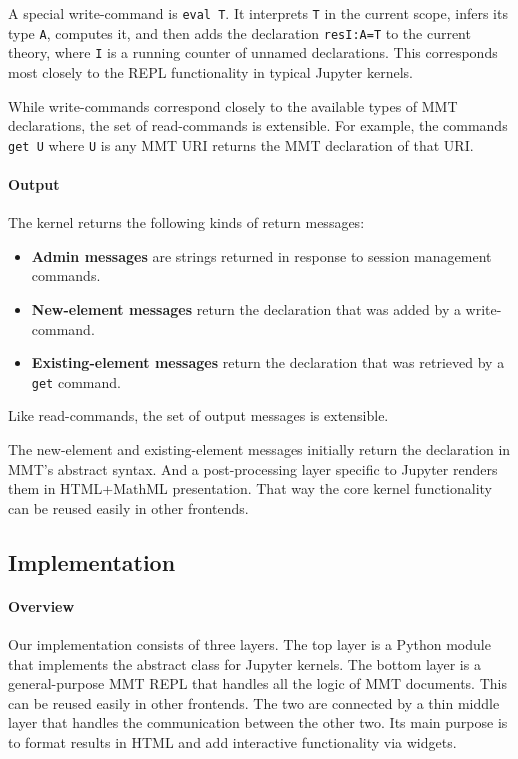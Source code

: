 A special write-command is \texttt{eval T}.
It interprets \texttt{T} in the current scope, infers its type \texttt{A}, computes it, and then adds the declaration \texttt{resI:A=T} to the current theory, where \texttt{I} is a running counter of unnamed declarations.
This corresponds most closely to the REPL functionality in typical Jupyter kernels.

While write-commands correspond closely to the available types of MMT declarations, the set of read-commands is extensible.
For example, the commands \texttt{get U} where \texttt{U} is any MMT URI returns the MMT declaration of that URI.

\paragraph{Output}
The kernel returns the following kinds of return messages:
\begin{itemize}
\item \textbf{Admin messages} are strings returned in response to session management commands.
\item \textbf{New-element messages} return the declaration that was added by a write-command.
\item \textbf{Existing-element messages} return the declaration that was retrieved by a \texttt{get} command.
\end{itemize}
Like read-commands, the set of output messages is extensible.

The new-element and existing-element messages initially return the declaration in MMT's abstract syntax.
And a post-processing layer specific to Jupyter renders them in HTML+MathML presentation.
That way the core kernel functionality can be reused easily in other frontends.

\subsection{Implementation}\label{sec:kernel:impl}

\paragraph{Overview}
Our implementation consists of three layers.
The top layer is a Python module that implements the abstract class for Jupyter kernels.
The bottom layer is a general-purpose MMT REPL that handles all the logic of MMT documents.
This can be reused easily in other frontends.
The two are connected by a thin middle layer that handles the communication between the other two.
Its main purpose is to format results in HTML and add interactive functionality via widgets.

